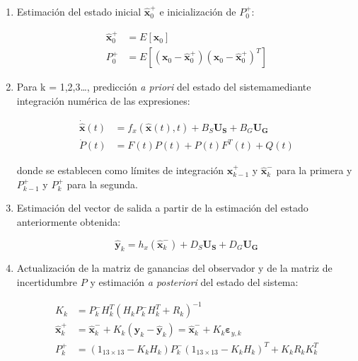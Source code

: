 \begin{enumerate}
\item Estimación del estado inicial $\boldsymbol{\hat{x}}_0^{+}$ e inicialización de $P_0^{+}$: 
  
\begin{equation}
\begin{split}
	\boldsymbol{\hat{x}}_0^{+} &= E[\boldsymbol{x}_0] \\
	P_0^{+} &= E[(\boldsymbol{x}_0 - \boldsymbol{\hat{x}}_0^{+})(\boldsymbol{x}_0 - \boldsymbol{\hat{x}}_0^{+})^T]
\end{split}
\end{equation}

\item Para k = 1,2,3\ldots, predicción \emph{a priori} del estado del sistema\footnotemark[2] mediante integración numérica de las expresiones:

\begin{equation}
\begin{split}
	\boldsymbol{\dot{\hat{x}}}(t) &= f_x(\boldsymbol{\hat{x}}(t),t) + B_S\boldsymbol{U_S} + B_G\boldsymbol{U_G} \\
	\dot{P}(t) &= F(t)P(t) + P(t)F^T(t) + Q(t)
\end{split}
\end{equation}

donde se establecen como límites de integración $\boldsymbol{\hat{x}}_{k-1}^{+}$ y $\boldsymbol{\hat{x}}_k^{-}$ para la primera y $P_{k-1}^{+}$ y $P_k^{+}$ para la segunda.

\item Estimación del vector de salida a partir de la estimación del estado anteriormente obtenida:

\begin{equation}
	\boldsymbol{\hat{y}}_k = h_x(\boldsymbol{\hat{x}}_k^{-}) + D_S\boldsymbol{U_S} + D_G\boldsymbol{U_G}
\end{equation}

\item Actualización de la matriz de ganancias del observador y de la matriz de incertidumbre $P$ y estimación \emph{a posteriori} del estado del sistema\footnotemark[2]:

\begin{equation}
\begin{split}
	K_k &= P_k^{-}H_k^T (H_k P_k^{-}H_k^T + R_k)^{-1} \\
	\boldsymbol{\hat{x}}_k^{+} &= \boldsymbol{\hat{x}}_k^{-} + K_k( \boldsymbol{y}_k - \boldsymbol{\hat{y}}_k) = \boldsymbol{\hat{x}}_k^{-} + K_k\boldsymbol{\varepsilon}_{y,k} \\
	P_k^{+} &= (1_{13\times13} - K_kH_k)P_k^{-}(1_{13\times13} - K_kH_k)^T + K_kR_kK_k^T
\end{split}
\end{equation}


\end{enumerate}
